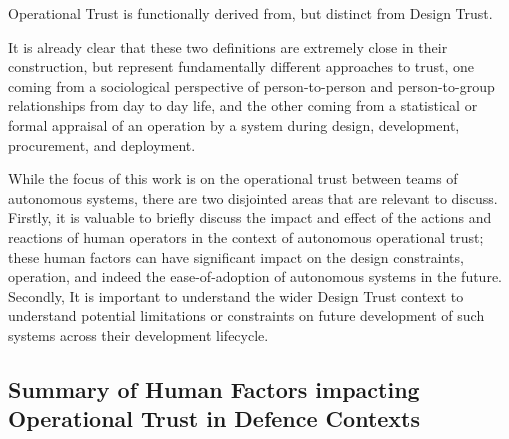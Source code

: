 Operational Trust is functionally derived from, but distinct from Design Trust.

It is already clear that these two definitions are extremely close in their construction, but represent fundamentally different approaches to trust, one coming from a sociological perspective of person-to-person and person-to-group relationships from day to day life, and the other coming from a statistical or formal appraisal of an operation by a system during design, development, procurement, and deployment.

While the focus of this work is on the operational trust between teams of autonomous systems, there are two disjointed areas that are relevant to discuss.
Firstly, it is valuable to briefly discuss the impact and effect of the actions and reactions of human operators in the context of autonomous operational trust; these human factors can have significant impact on the design constraints, operation, and indeed the ease-of-adoption of autonomous systems in the future. 
Secondly, It is important to understand the wider Design Trust context to understand potential limitations or constraints on future development of such systems across their development lifecycle.

\subsection{Summary of Human Factors impacting Operational Trust in Defence Contexts}

